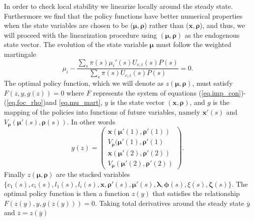 \documentclass[thmsb,11pt]{article}
\newcommand{\bmat}{\begin{matrix}}
\newcommand{\emat}{\end{matrix}}
\newcommand{\ov}{\overline}
\begin{document}
In order to check local stability we linearize locally around the steady state. Furthermore we find that the policy functions have better numerical properties when the state variables are chosen to be ($\bm \mu,\bm \rho$) rather than ($\bm x,\bm \rho$), and thus, we will proceed with the linearization procedure using $(\bm \mu,\bm \rho)$ as the endogenous state vector.  The evolution of the state variable $\bm  \mu$ must follow the weighted martingale
\begin{equation}
	\mu_i - \frac{\sum_s \pi(s) \mu_i'(s)U_{c,i}(s)P(s)}{\sum_s \pi(s) U_{c,i}(s)P(s)} = 0\label{eq.mu_mart}.
\end{equation}  The optimal policy function, which we will denote as $z(\bm \mu,\bm\rho)$, must satisfy $F(z,y,g(z)) = 0$ where $F$ represents the system of equations (\ref{eq.imp_con})-(\ref{eq.foc_rho})and \eqref{eq.mu_mart}, $y$ is the state vector $(\bm x,\bm \rho)$, and $g$ is the mapping of the policies into functions of future variables, namely $\bm x'(s)$ and $V_{\bm \rho}(\bm \mu'(s),\bm \rho(s))$.  In other words
\[
	g(z) = \left(\bmat \bm x(\bm \mu'(1),\bm \rho'(1))\\ V_{\bm \rho}(\bm \mu'(1),\bm \rho'(1)\\ \bm x(\bm \mu'(2),\bm \rho'(2))\\ V_{\bm \rho}(\bm \mu'(2),\bm \rho'(2))\emat\right).
\]  Finally $z(\bm \mu,\bm \rho)$ are the stacked variables $\{c_1(s),c_i(s),l_1(s),l_i(s),\bm x,\bm \rho'(s),\bm \mu'(s),\bm \lambda,\bm \phi(s),\xi(s),\bm \zeta(s)\}$.  The optimal policy function is then a function $z(y)$ that satisfies the relationship $F(z(y),y,g(z(y))) = 0$.  Taking total derivatives around the steady state $\ov y$ and $\ov z = z(\ov y)$
\end{document}
